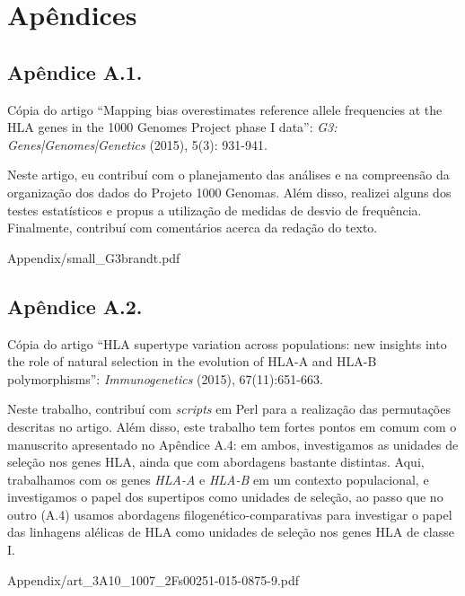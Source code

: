 \clearpage
\thispagestyle{empty}
\chapter*{Apêndices}
\pagestyle{plain}
\newpage
\newpage
\section{Apêndice A.1.}

Cópia do artigo \enquote{Mapping bias overestimates reference allele frequencies at the HLA genes in the 1000 Genomes Project phase I data}: \emph{G3: Genes|Genomes|Genetics} (2015), 5(3): 931-941.

Neste artigo, eu contribuí com o planejamento das análises e
na compreensão da organização dos dados do Projeto 1000 Genomas. Além disso, realizei alguns dos testes estatísticos e propus a utilização de medidas de desvio de frequência. Finalmente, contribuí com comentários acerca da redação do texto.



            {Appendix/small_G3brandt.pdf}

\section{Apêndice A.2.}

Cópia do artigo \enquote{HLA supertype variation across populations: new insights into the role of natural selection in the evolution of HLA-A and HLA-B polymorphisms}: \emph{Immunogenetics} (2015), 67(11):651-663.

Neste trabalho, contribuí com \emph{scripts} em Perl para a realização das permutações descritas no artigo. Além disso, este trabalho tem fortes pontos em comum com o manuscrito apresentado no Apêndice A.4: em ambos, investigamos as unidades de seleção nos genes HLA, ainda que com abordagens bastante distintas. Aqui, trabalhamos com os genes \emph{HLA-A} e \emph{HLA-B} em um contexto populacional, e investigamos o papel dos supertipos como unidades de seleção, ao passo que no outro (A.4) usamos abordagens filogenético-comparativas para investigar o papel das linhagens alélicas de HLA como unidades de seleção nos genes HLA de classe I. 

            {Appendix/art_3A10_1007_2Fs00251-015-0875-9.pdf}
